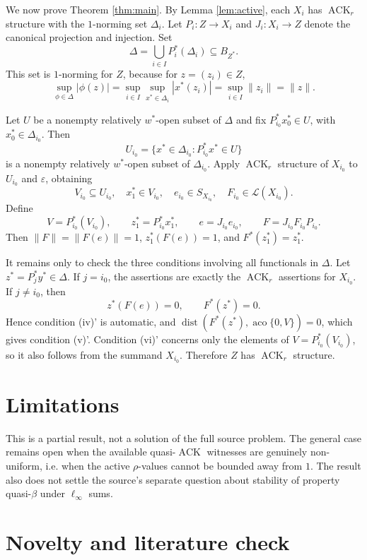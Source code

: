 \documentclass[11pt]{article}
\newcommand{\ACK}{\operatorname{ACK}}
\newcommand{\aco}{\operatorname{aco}}
\newcommand{\dist}{\operatorname{dist}}
\newcommand{\Lin}{\mathcal L}
\newcommand{\eps}{\varepsilon}
\begin{document}
We now prove Theorem \ref{thm:main}.  By Lemma \ref{lem:active}, each \(X_i\)
has \(\ACK_r\) structure with the \(1\)-norming set \(\Delta_i\).
Let \(P_i:Z\to X_i\) and \(J_i:X_i\to Z\) denote the canonical projection and
injection.  Set
\[
\Delta=\bigcup_{i\in I}P_i^*(\Delta_i)\subseteq B_{Z^*}.
\]
This set is \(1\)-norming for \(Z\), because for \(z=(z_i)\in Z\),
\[
\sup_{\phi\in\Delta}|\phi(z)|
=\sup_{i\in I}\sup_{x^*\in\Delta_i}|x^*(z_i)|
=\sup_{i\in I}\|z_i\|
=\|z\|.
\]

Let \(U\) be a nonempty relatively \(w^*\)-open subset of \(\Delta\) and fix
\(P_{i_0}^*x_0^*\in U\), with \(x_0^*\in\Delta_{i_0}\).  Then
\[
U_{i_0}=\{x^*\in\Delta_{i_0}:P_{i_0}^*x^*\in U\}
\]
is a nonempty relatively \(w^*\)-open subset of \(\Delta_{i_0}\).  Apply
\(\ACK_r\) structure of \(X_{i_0}\) to \(U_{i_0}\) and \(\eps\), obtaining
\[
V_{i_0}\subseteq U_{i_0},\quad x_1^*\in V_{i_0},\quad
e_{i_0}\in S_{X_{i_0}},\quad F_{i_0}\in\Lin(X_{i_0}).
\]
Define
\[
V=P_{i_0}^*(V_{i_0}),\qquad z_1^*=P_{i_0}^*x_1^*,\qquad
e=J_{i_0}e_{i_0},\qquad F=J_{i_0}F_{i_0}P_{i_0}.
\]
Then \(\|F\|=\|F(e)\|=1\), \(z_1^*(F(e))=1\), and
\(F^*(z_1^*)=z_1^*\).

It remains only to check the three conditions involving all functionals in
\(\Delta\).  Let \(z^*=P_j^*y^*\in\Delta\).  If \(j=i_0\), the assertions are
exactly the \(\ACK_r\) assertions for \(X_{i_0}\).  If \(j\ne i_0\), then
\[
z^*(F(e))=0,\qquad F^*(z^*)=0.
\]
Hence condition (iv)' is automatic, and
\(\dist(F^*(z^*),\aco\{0,V\})=0\), which gives condition (v)'.  Condition
(vi)' concerns only the elements of \(V=P_{i_0}^*(V_{i_0})\), so it also
follows from the summand \(X_{i_0}\).  Therefore \(Z\) has \(\ACK_r\)
structure.

\section*{Limitations}

This is a partial result, not a solution of the full source problem.  The
general case remains open when the available quasi-\(\ACK\) witnesses are
genuinely non-uniform, i.e. when the active \(\rho\)-values cannot be bounded
away from \(1\).  The result also does not settle the source's separate
question about stability of property quasi-\(\beta\) under \(\ell_\infty\)
sums.

\section*{Novelty and literature check}
\end{document}
